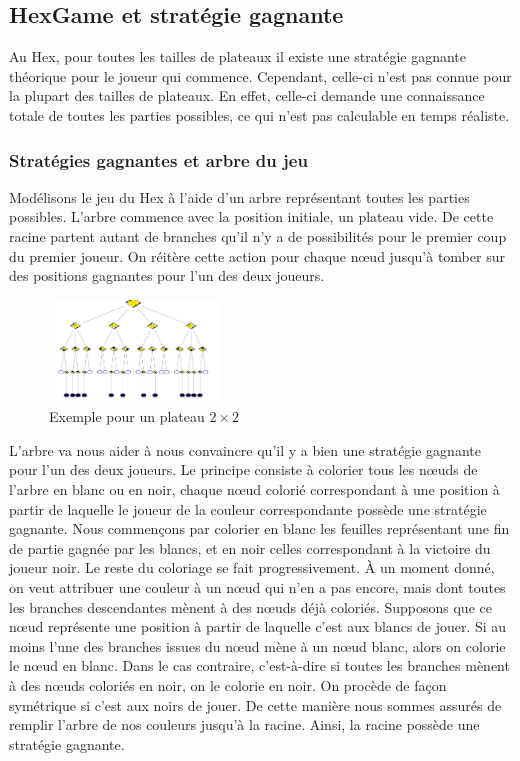 \subsection{HexGame et stratégie gagnante}

Au Hex, pour toutes les tailles de plateaux il existe une stratégie gagnante théorique pour le joueur qui commence.
Cependant, celle-ci n'est pas connue pour la plupart des tailles de plateaux. En effet, celle-ci demande une connaissance totale de toutes 
les parties possibles, ce qui n'est pas calculable en temps réaliste.

\subsubsection{Stratégies gagnantes et arbre du jeu}
Modélisons le jeu du Hex à l'aide d'un arbre représentant toutes les parties possibles. L'arbre commence avec la position 
initiale, un plateau vide. De cette racine partent autant de branches qu'il n'y a de possibilités pour 
le premier coup du premier joueur. On réitère cette action pour chaque nœud jusqu'à tomber sur des positions gagnantes pour l'un des deux joueurs.
\begin{figure}[!htb]
    \begin{center}
        \includegraphics[width=0.4\textwidth]{root/strategie_gagnante.png}
    \end{center}
    \caption{Exemple pour un plateau $2\times2$}\label{fig:strategie_gagnante}
\end{figure}

L'arbre va nous aider à nous convaincre qu'il y a bien une stratégie gagnante pour l'un des deux joueurs. 
Le principe consiste à colorier tous les nœuds de l'arbre en blanc ou en noir, chaque
nœud colorié correspondant à une position à partir de laquelle le joueur de la couleur correspondante
possède une stratégie gagnante. 
Nous commençons par colorier en blanc les feuilles représentant une fin de
partie gagnée par les blancs, et en noir celles correspondant à la victoire du joueur noir.
Le reste du coloriage se fait progressivement. À un moment donné, on veut attribuer une couleur
à un nœud qui n'en a pas encore, mais dont toutes les branches descendantes mènent à des nœuds
déjà coloriés. Supposons que ce nœud représente une position à partir de laquelle c'est aux blancs de
jouer. Si au moins l'une des branches issues du nœud mène à un nœud blanc, alors on colorie le nœud
en blanc. Dans le cas contraire, c'est-à-dire si toutes les branches mènent à des nœuds coloriés en
noir, on le colorie en noir. On procède de façon symétrique si c'est aux noirs de jouer.
De cette manière nous sommes assurés de remplir l'arbre de nos couleurs jusqu'à la racine. 
Ainsi, la racine possède une stratégie gagnante.


